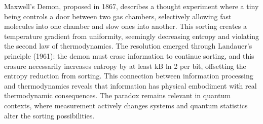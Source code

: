 Maxwell's Demon, proposed in 1867, describes a thought experiment where a tiny being controls a door between two gas chambers, selectively allowing fast molecules into one chamber and slow ones into another. This sorting creates a temperature gradient from uniformity, seemingly decreasing entropy and violating the second law of thermodynamics. The resolution emerged through Landauer's principle (1961): the demon must erase information to continue sorting, and this erasure necessarily increases entropy by at least kB ln 2 per bit, offsetting the entropy reduction from sorting. This connection between information processing and thermodynamics reveals that information has physical embodiment with real thermodynamic consequences. The paradox remains relevant in quantum contexts, where measurement actively changes systems and quantum statistics alter the sorting possibilities.

